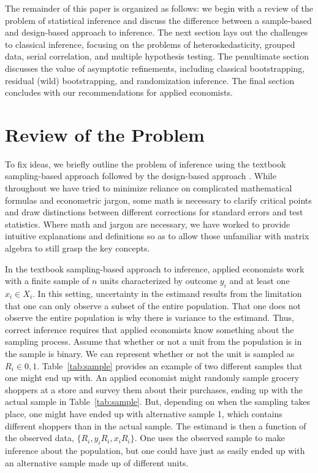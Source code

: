 \documentclass[11pt]{article}
\begin{document}
The remainder of this paper is organized as follows: we begin with a review of the problem of statistical inference and discuss the difference between a sample-based and design-based approach to inference. The next section lays out the challenges to classical inference, focusing on the problems of heteroskedasticity, grouped data, serial correlation, and multiple hypothesis testing. The penultimate section discusses the value of asymptotic refinements, including classical bootstrapping, residual (wild) bootstrapping, and randomization inference. The final section concludes with our recommendations for applied economists. 


\section{Review of the Problem}

To fix ideas, we briefly outline the problem of inference using the textbook sampling-based approach \citep{cameron_microeconometrics_2005, angrist_mostly_2009, wooldridge_econometric_2010} followed by the design-based approach \citep{abadie_when_2017, abadie_samplingbased_2020}. While throughout we have tried to minimize reliance on complicated mathematical formulas and econometric jargon, some math is necessary to clarify critical points and draw distinctions between different corrections for standard errors and test statistics. Where math and jargon are necessary, we have worked to provide intuitive explanations and definitions so as to allow those unfamiliar with matrix algebra to still grasp the key concepts.

In the textbook sampling-based approach to inference, applied economists work with a finite sample of $n$ units characterized by outcome $y_i$ and at least one $x_i \in X_i$. In this setting, uncertainty in the estimand results from the limitation that one can only observe a subset of the entire population. That one does not observe the entire population is why there is variance to the estimand. Thus, correct inference requires that applied economists know something about the sampling process. Assume that whether or not a unit from the population is in the sample is binary. We can represent whether or not the unit is sampled as $R_i \in {0,1}$. Table~\ref{tab:sample} provides an example of two different samples that one might end up with. An applied economist might randomly sample grocery shoppers at a store and survey them about their purchases, ending up with the actual sample in Table~\ref{tab:sample}. But, depending on when the sampling takes place, one might have ended up with alternative sample 1, which contains different shoppers than in the actual sample. The estimand is then a function of the observed data, $\{R_i, y_i R_i, x_i R_i \}$. One uses the observed sample to make inference about the population, but one could have just as easily ended up with an alternative sample made up of different units.
\end{document}

